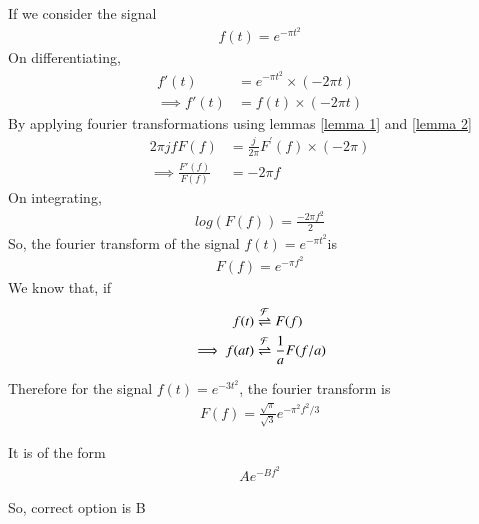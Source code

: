 \documentclass[journal,12pt,twocolumn]{IEEEtran}
\begin{document}
If we consider the signal
\begin{align}
    f(t) = e^{-\pi t^2}
\end{align}
On differentiating,
\begin{align}
     f'(t) &= e^{-\pi t^2}\times(-2\pi t)\\
    \implies f'(t) &= f(t)\times (-2\pi t)
\end{align}
By applying fourier transformations using lemmas \ref{lemma 1} and \ref{lemma 2}
\begin{align}
    2\pi jfF(f) &= \frac{j}{2\pi}F^{'}(f) \times (-2\pi)\\
    \implies \frac{F'(f)}{F(f)} &= -2\pi f
\end{align}
On integrating,
\begin{align}
    log(F(f)) = \frac{-2\pi f^2}{2}
\end{align}
So, the fourier transform of the signal $f(t) = e^{-\pi t^2}$is
\begin{align}
    F(f) = e^{-\pi f^2}
\end{align}
We know that, if 
\begin{align}
    f(t) &\overset{\mathcal{F}}{ \rightleftharpoons} F(f)\\
    \implies f(at) &\overset{\mathcal{F}}{ \rightleftharpoons} \frac{1}{a}F(f/a)
\end{align}

Therefore for the signal $f(t) = e^{-3t^2}$, the fourier transform is  
\begin{align}
   F(f) =  \frac{\sqrt{\pi}}{\sqrt{3}}e^{-\pi^2 f^2/3}
\end{align}

It is of the form 
\begin{align}
    Ae^{-Bf^2} 
\end{align}

So, correct option is B
\end{document}
